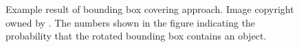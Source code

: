 \begin{figure}[!h]
	\centering
    \caption[Example result of bounding box covering approach]{Example result of bounding box covering approach. Image copyright owned by \cite{msnadine}. The numbers shown in the figure indicating the probability that the rotated bounding box contains an object.}
    \label{fig:rotbbox}
\end{figure}